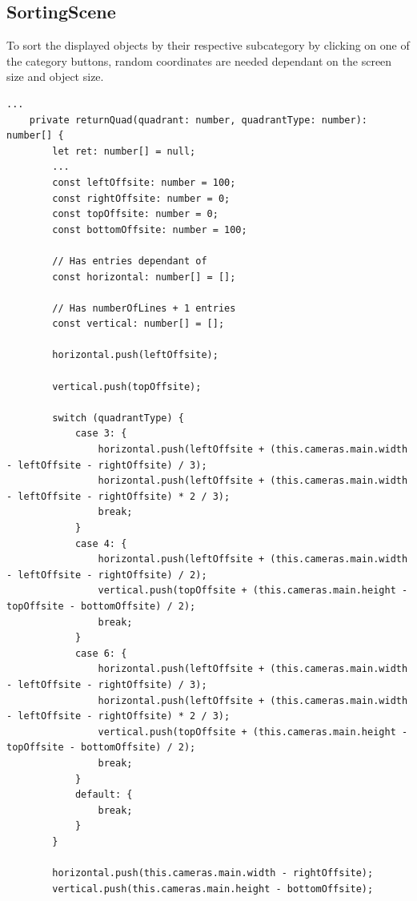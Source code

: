 \subsection{SortingScene}\label{subsec:sortingscene}
To sort the displayed objects by their respective subcategory by clicking on one of the category buttons,
random coordinates are needed dependant on the screen size and object size.
\begin{lstlisting}[style=TypeScript, caption={returnQuad() (sortingScene.ts)}]
    ...
    private returnQuad(quadrant: number, quadrantType: number): number[] {
        let ret: number[] = null;
        ...
        const leftOffsite: number = 100;
        const rightOffsite: number = 0;
        const topOffsite: number = 0;
        const bottomOffsite: number = 100;

        // Has entries dependant of
        const horizontal: number[] = [];

        // Has numberOfLines + 1 entries
        const vertical: number[] = [];

        horizontal.push(leftOffsite);

        vertical.push(topOffsite);

        switch (quadrantType) {
            case 3: {
                horizontal.push(leftOffsite + (this.cameras.main.width - leftOffsite - rightOffsite) / 3);
                horizontal.push(leftOffsite + (this.cameras.main.width - leftOffsite - rightOffsite) * 2 / 3);
                break;
            }
            case 4: {
                horizontal.push(leftOffsite + (this.cameras.main.width - leftOffsite - rightOffsite) / 2);
                vertical.push(topOffsite + (this.cameras.main.height - topOffsite - bottomOffsite) / 2);
                break;
            }
            case 6: {
                horizontal.push(leftOffsite + (this.cameras.main.width - leftOffsite - rightOffsite) / 3);
                horizontal.push(leftOffsite + (this.cameras.main.width - leftOffsite - rightOffsite) * 2 / 3);
                vertical.push(topOffsite + (this.cameras.main.height - topOffsite - bottomOffsite) / 2);
                break;
            }
            default: {
                break;
            }
        }

        horizontal.push(this.cameras.main.width - rightOffsite);
        vertical.push(this.cameras.main.height - bottomOffsite);


\end{lstlisting}
